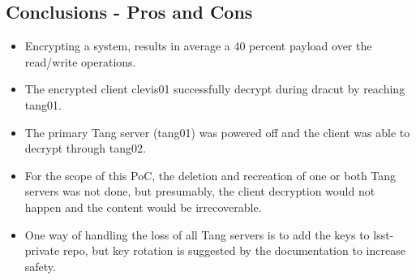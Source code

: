 \newpage
\subsection{Conclusions - Pros and Cons}
\begin{itemize}
  \item Encrypting a system, results in average a 40 percent payload over the read/write operations.
  \item The encrypted client clevis01 successfully decrypt during dracut by reaching tang01.
  \item The primary Tang server (tang01) was powered off and the client was able to decrypt through tang02.
  \item For the scope of this PoC, the deletion and recreation of one or both Tang servers was not done, but presumably, the client decryption would not happen and the content would be irrecoverable.
  \item One way of handling the loss of all Tang servers is to add the keys to lsst-private repo, but key rotation is suggested by the documentation to increase safety.
\end{itemize}